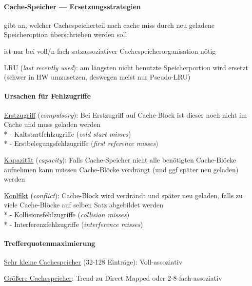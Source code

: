 \paragraph{Cache-Speicher --- Ersetzungsstrategien}
\begin{items}
	\item gibt an, welcher Cachespeicherteil nach cache miss durch neu geladene Speicheroption überschrieben werden soll
	\item ist nur bei voll/n-fach-satzassoziativer Cachespeicherorganisation nötig
	\item \underline{LRU} (\emph{last recently used}): am längsten nicht benutzte Speicherportion wird ersetzt (schwer in HW umzusetzen, deswegen meist nur Pseudo-LRU)
\end{items}

\paragraph{Ursachen für Fehlzugriffe}
\begin{items}
	\item \underline{Erstzugriff} (\emph{compulsory}): Bei Erstzugriff auf Cache-Block ist dieser noch nicht im Cache und muss geladen werden \\*
	- Kaltstartfehlzugriffe (\emph{cold start misses}) \\*
	- Erstbelegungsfehlzugriffe (\emph{first reference misses})
	\item \underline{Kapazität} (\emph{capacity}): Falls Cache-Speicher nicht alle benötigten Cache-Blöcke aufnehmen kann müssen Cache-Blöcke verdrängt (und ggf später neu geladen) werden
	\item \underline{Konlfikt} (\emph{conflict}): Cache-Block wird verdrändt und später neu geladen, falls zu viele Cache-Blöcke auf selben Satz abgebildet werden \\*
	- Kollisionsfehlzugriffe (\emph{collision misses}) \\*
	- Interferenzfehlzugriffe (\emph{interference misses})
\end{items}

\paragraph{Trefferquotenmaximierung}
\begin{items}
	\item \underline{Sehr kleine Cachespeicher} (32-128 Einträge): Voll-assoziativ
	\item \underline{Größere Cachespeicher}: Trend zu Direct Mapped oder 2-8-fach-assoziativ
\end{items}

